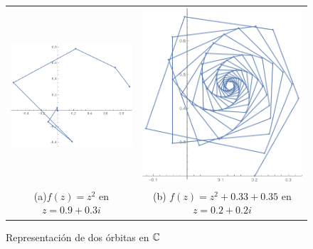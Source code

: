 \begin{figure}[ht]
    \centering
    \begin{tabular}{cc}
      \includegraphics[scale=0.45]{./img/orbita-1.png} &   \includegraphics[scale=0.4]{./img/orbita-2.png} \\
    (a)$f(z)=z^2$ en $z=0.9+0.3i$ & (b) $f(z)=z^2+0.33+0.35$ en $z=0.2+0.2i$ \\[6pt]
    \end{tabular}
    \caption{Representación de dos órbitas en $\mathbb{C}$}
    \label{fig:orbitas-C}
\end{figure}

